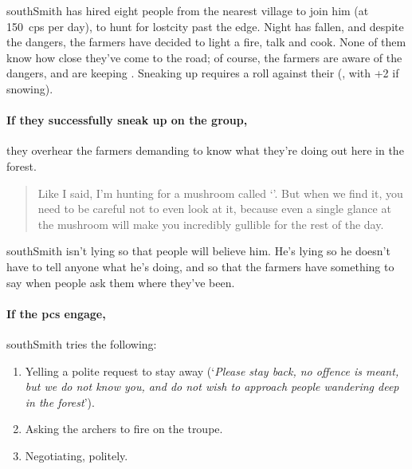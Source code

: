 \Gls{southSmith} has hired eight people from the nearest \gls{village} to join him (at 150~\glspl{cp} per day), to hunt for \gls{lostcity} past the \gls{edge}.
Night has fallen, and despite the dangers, the farmers have decided to light a fire, talk and cook.
None of them know how close they've come to the road; of course, the farmers are aware of the dangers, and are keeping .
Sneaking up requires a  roll against their  (\tn, with +2 if snowing).



\paragraph{If they successfully sneak up on the group,}
they overhear the farmers demanding to know what they're doing out here in the forest.

\begin{quotation}
  Like I said, I'm hunting for a mushroom called `'.
  But when we find it, you need to be careful not to even look at it, because even a single glance at the mushroom will make you incredibly gullible for the rest of the day.
\end{quotation}

\Gls{southSmith} isn't lying so that people will believe him.
He's lying so he doesn't have to tell anyone what he's doing, and so that the farmers have something to say when people ask them where they've been.

\paragraph{If the \glspl{pc} engage,}
\Gls{southSmith} tries the following:

\begin{enumerate}
  \item
  Yelling a polite request to stay away (`\textit{Please stay back, no offence is meant, but we do not know you, and do not wish to approach people wandering deep in the forest}').
  \item
  Asking the archers to fire on the troupe.
  \item
  Negotiating, politely.
\end{enumerate}

